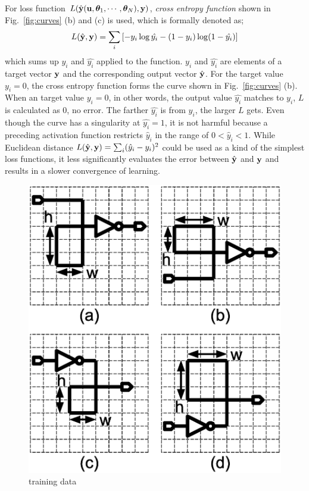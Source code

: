 \documentclass[twocolumn]{article}
\begin{document}
For loss function
$L(\hat{\bf y}({\bf u},{\bm \theta}_1,\cdots,{\bm \theta}_N),{\bf y})$,
{\it cross entropy function} shown in Fig.\ \ref{fig:curves} (b) and (c)
is used, which is formally denoted as;
\begin{eqnarray}
L(\hat{\bf y},{\bf y})
= \sum_i \left[ - y_i \log \hat{y_i} - (1-y_i) \log (1-\hat{y_i}) \right]
\end{eqnarray}
which sums up $y_i$ and $\hat{y_i}$ applied to the function.
$y_i$ and $\hat{y_i}$ are elements of a target vector ${\bf y}$ and
the corresponding output vector $\hat{\bf y}$.
For the target value $y_i = 0$,
the cross entropy function forms the curve
shown in Fig.\ \ref{fig:curves} (b).
When an target value $y_i = 0$, in other words,
the output value $\hat{y_i}$ matches to $y_i$,
$L$ is calculated as 0, no error.
The farther $\hat{y_i}$ is from $y_i$, the larger $L$ gets.
Even though the curve has a singularity at $\hat{y_i} = 1$, 
it is not harmful because a preceding activation function
restricts $\hat{y}_i$ in the range of $0 < \hat{y}_i < 1$.
While Euclidean distance
$L(\hat{\bf y}, {\bf y}) = \sum_i (\hat{y}_i - y_i)^2$
could be used as a kind of the simplest loss functions,
it less significantly evaluates the error between $\hat{\bf y}$ and ${\bf y}$
and results in a slower convergence of learning.

\begin{figure}[!tp]
  \begin{minipage}{\hsize}
 \begin{center}
   \includegraphics[width=0.7\hsize]{fig/training_data_02.eps}
   \caption{training data}
   \label{fig:training_data}
 \end{center}
  \end{minipage}
\end{figure}
\end{document}
